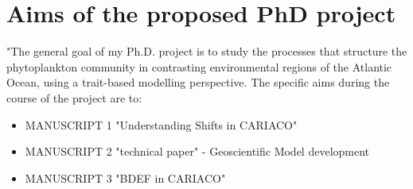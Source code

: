 \section{Aims of the proposed PhD project}
"The general goal of my Ph.D. project is to study the processes that structure the phytoplankton community in contrasting environmental regions of the Atlantic Ocean, using a trait-based modelling perspective. The specific aims during the course of the project are to:

\begin{itemize}
\item MANUSCRIPT 1 "Understanding Shifts in CARIACO"
\item MANUSCRIPT 2 "technical paper" - Geoscientific Model development
\item MANUSCRIPT 3 "BDEF in CARIACO"
\end{itemize}
